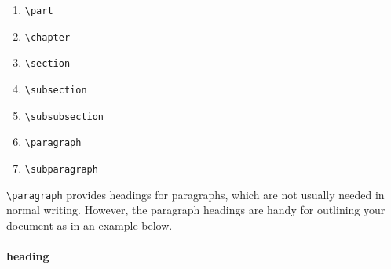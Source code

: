 \documentclass[a4paper,12pt]{article}
\begin{document}
\begin{enumerate}
    \item \verb|\part|
    \item \verb|\chapter|
    \item \verb|\section|
    \item \verb|\subsection|
    \item \verb|\subsubsection|
    \item \verb|\paragraph|
    \item \verb|\subparagraph|
\end{enumerate}

\verb|\paragraph| provides headings for paragraphs, which are not usually needed in normal writing. However, the paragraph headings are handy for outlining your document as in an example below.

\begin{tcolorbox}
    \paragraph{heading} \lipsum[6] 
\end{tcolorbox}
\end{document}
